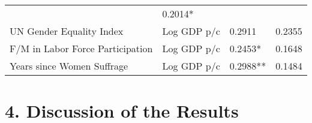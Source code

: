 \documentclass[
  11pt,
]{article}
\begin{document}
\begin{longtable}[]{@{}llll@{}}
\begin{minipage}[t]{0.22\columnwidth}
\end{minipage} & \begin{minipage}[t]{0.22\columnwidth}\raggedright
0.2014*\strut
\end{minipage}\tabularnewline
\begin{minipage}[t]{0.22\columnwidth}\raggedright
UN Gender Equality Index\strut
\end{minipage} & \begin{minipage}[t]{0.22\columnwidth}\raggedright
Log GDP p/c\strut
\end{minipage} & \begin{minipage}[t]{0.22\columnwidth}\raggedright
0.2911\strut
\end{minipage} & \begin{minipage}[t]{0.22\columnwidth}\raggedright
0.2355\strut
\end{minipage}\tabularnewline
\begin{minipage}[t]{0.22\columnwidth}\raggedright
F/M in Labor Force Participation\strut
\end{minipage} & \begin{minipage}[t]{0.22\columnwidth}\raggedright
Log GDP p/c\strut
\end{minipage} & \begin{minipage}[t]{0.22\columnwidth}\raggedright
0.2453*\strut
\end{minipage} & \begin{minipage}[t]{0.22\columnwidth}\raggedright
0.1648\strut
\end{minipage}\tabularnewline
\begin{minipage}[t]{0.22\columnwidth}\raggedright
Years since Women Suffrage\strut
\end{minipage} & \begin{minipage}[t]{0.22\columnwidth}\raggedright
Log GDP p/c\strut
\end{minipage} & \begin{minipage}[t]{0.22\columnwidth}\raggedright
0.2988**\strut
\end{minipage} & \begin{minipage}[t]{0.22\columnwidth}\raggedright
0.1484\strut
\end{minipage}\tabularnewline
\bottomrule
\end{longtable}

\hypertarget{discussion-of-the-results}{%
\section{4. Discussion of the Results}\label{discussion-of-the-results}}
\end{document}

